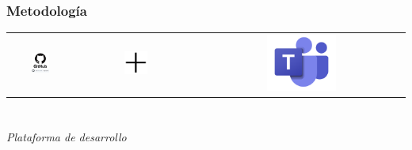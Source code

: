 \documentclass{beamer}
\begin{document}
\begin{frame}
\frametitle{Metodología}
\begin{table}[htbp]
  \centering
  \begin{tabular}{ccc}
      \includegraphics[width=0.3\textwidth, valign=m]{figs/repo.png} & \includegraphics[width=0.2\textwidth, valign=m]{figs/plus.png} & \includegraphics[width=0.35\textwidth, valign=m]{figs/teams.png} 
  \end{tabular}
\end{table}
\end{frame}

\section*{}
\begin{frame}{}
  \centering \Huge
  \emph{Plataforma de desarrollo}
\end{frame}
\end{document}
